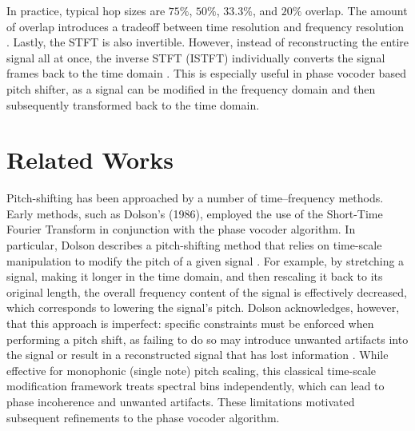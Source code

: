 \documentclass[12pt]{article}
\begin{document}
In practice, typical hop sizes are $75\%$, $50\%$, $33.3\%$, and $20\%$ overlap. The amount of overlap introduces a tradeoff between time resolution and frequency resolution \cite{royer2019pitch}. 
Lastly, the STFT is also invertible. However, instead of reconstructing the entire signal all at once, the inverse STFT (ISTFT) individually converts the signal frames back to the time domain 
 . This is especially useful in phase vocoder based pitch shifter, as a signal can be modified in the frequency domain and then subsequently transformed back to the time domain. 


\section{Related Works}

Pitch-shifting has been approached by a number of time--frequency methods. 
Early methods, such as Dolson's (1986), employed the use of the Short-Time 
Fourier Transform in conjunction with the phase vocoder algorithm. 
In particular, Dolson describes a pitch-shifting method that relies on 
time-scale manipulation to modify the pitch of a given signal \cite{dolson1986phase}. 
For example, by stretching a signal, making it longer in the time domain, 
and then rescaling it back to its original length, the overall frequency 
content of the signal is effectively decreased, which corresponds to 
lowering the signal's pitch. Dolson acknowledges, however, that this 
approach is imperfect: specific constraints must be enforced when 
performing a pitch shift, as failing to do so may introduce unwanted 
artifacts into the signal or result in a reconstructed signal that has 
lost information \cite{dolson1986phase}. While effective for monophonic (single note) pitch scaling, 
this classical time-scale modification framework treats spectral bins independently, 
which can lead to phase incoherence and unwanted artifacts. 
These limitations motivated subsequent refinements to the phase vocoder algorithm.
\end{document}
